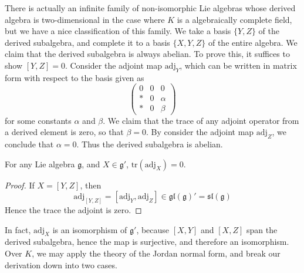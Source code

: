 There is actually an infinite family of non-isomorphic Lie algebras whose derived algebra is two-dimensional in the case where $K$ is a algebraically complete field, but we have a nice classification of this family. We take a basis $\{ Y,Z \}$ of the derived subalgebra, and complete it to a basis $\{ X,Y,Z \}$ of the entire algebra. We claim that the derived subalgebra is always abelian. To prove this, it suffices to show $[Y,Z] = 0$. Consider the adjoint map $\text{adj}_Y$, which can be written in matrix form with respect to the basis given as
%
\[ \begin{pmatrix} 0 & 0 & 0 \\ * & 0 & \alpha \\ * & 0 & \beta \end{pmatrix} \]
%
for some constants $\alpha$ and $\beta$. We claim that the trace of any adjoint operator from a derived element is zero, so that $\beta = 0$. By consider the adjoint map $\text{adj}_Z$, we conclude that $\alpha = 0$. Thus the derived subalgebra is abelian.

\begin{lemma}
    For any Lie algebra $\mathfrak{g}$, and $X \in \mathfrak{g}'$, $\text{tr}(\text{adj}_X) = 0$.
\end{lemma}
\begin{proof}
    If $X = [Y,Z]$, then
    \[ \text{adj}_{[Y,Z]} = [\text{adj}_Y, \text{adj}_Z] \in \mathfrak{gl}(\mathfrak{g})' = \mathfrak{sl}(\mathfrak{g}) \]
    Hence the trace the adjoint is zero.
\end{proof}

In fact, $\text{adj}_X$ is an isomorphism of $\mathfrak{g}'$, because $[X,Y]$ and $[X,Z]$ span the derived subalgebra, hence the map is surjective, and therefore an isomorphism. Over $K$, we may apply the theory of the Jordan normal form, and break our derivation down into two cases.

